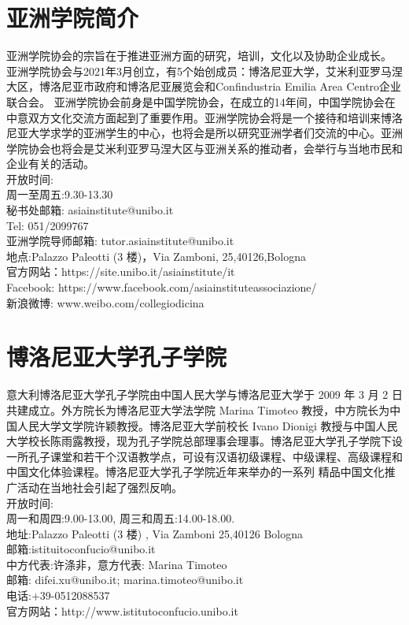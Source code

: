 \section{亚洲学院简介}


亚洲学院协会的宗旨在于推进亚洲方面的研究，培训，文化以及协助企业成长。
亚洲学院协会与2021年3月创立，有5个始创成员：博洛尼亚大学，艾米利亚罗马涅大区，博洛尼亚市政府和博洛尼亚展览会和Confindustria Emilia Area Centro企业联合会。 亚洲学院协会前身是中国学院协会，在成立的14年间，中国学院协会在中意双方文化交流方面起到了重要作用。亚洲学院协会将是一个接待和培训来博洛尼亚大学求学的亚洲学生的中心，也将会是所以研究亚洲学者们交流的中心。亚洲学院协会也将会是艾米利亚罗马涅大区与亚洲关系的推动者，会举行与当地市民和企业有关的活动。\\
\noindent 
开放时间:\\
周一至周五:9.30-13.30\\
秘书处邮箱: asiainstitute@unibo.it \\
Tel: 051/2099767 \\
亚洲学院导师邮箱: tutor.asiainstitute@unibo.it\\
地点:Palazzo Paleotti (3 楼)，Via Zamboni, 25,40126,Bologna \\
官方网站：https://site.unibo.it/asiainstitute/it\\
Facebook: https://www.facebook.com/asiainstituteassociazione/ \\
新浪微博: www.weibo.com/collegiodicina\\


\section{博洛尼亚大学孔子学院}

意大利博洛尼亚大学孔子学院由中国人民大学与博洛尼亚大学于 2009 年 3 月 2 日共建成立。外方院长为博洛尼亚大学法学院 Marina Timoteo 教授，中方院长为中国人民大学文学院许颖教授。博洛尼亚大学前校长 Ivano Dionigi 教授与中国人民大学校长陈雨露教授，现为孔子学院总部理事会理事。博洛尼亚大学孔子学院下设一所孔子课堂和若干个汉语教学点，可设有汉语初级课程、中级课程、高级课程和中国文化体验课程。博洛尼亚大学孔子学院近年来举办的一系列 精品中国文化推广活动在当地社会引起了强烈反响。 \\
\noindent 
开放时间: \\
周一和周四:9.00-13.00, 周三和周五:14.00-18.00. \\
地址:Palazzo Paleotti (3 楼) , Via Zamboni 25,40126 Bologna \\
邮箱:istituitoconfucio@unibo.it \\
中方代表:许涤非，意方代表: Marina Timoteo \\
邮箱: difei.xu@unibo.it; marina.timoteo@unibo.it \\
电话:+39-0512088537 \\
官方网站：http://www.istitutoconfucio.unibo.it\\

